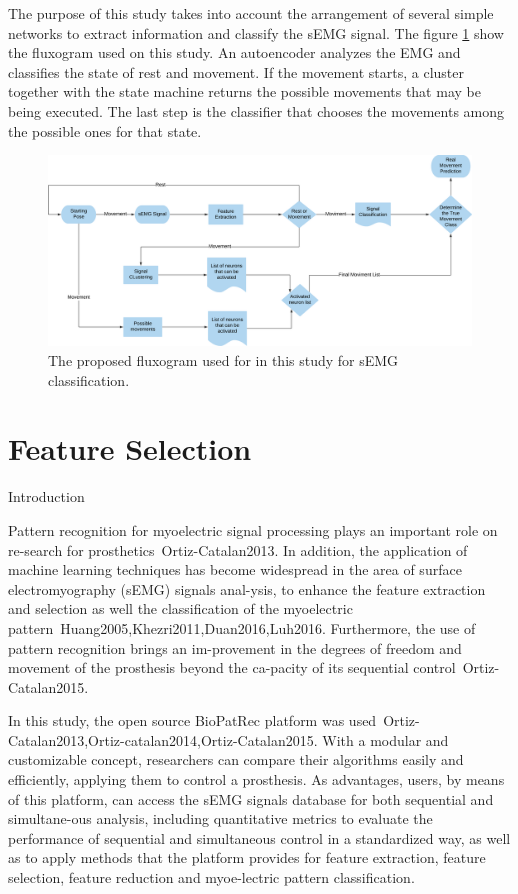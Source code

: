 \documentclass[a4paper, 12pt]{ppgeb}
\makeatletter
\renewcommand{\section}{\@startsection
{section}
{1}
{0mm}
{-\baselineskip}
{0.5\baselineskip}
{\large\bfseries\scshape}}
\makeatother
\begin{document}
The purpose of this study takes into account the arrangement of several simple networks to extract information and classify the sEMG signal. The figure \ref{fig_final_flux} show the fluxogram used on this study. An autoencoder analyzes the EMG and classifies the state of rest and movement. If the movement starts, a cluster together with the state machine returns the possible movements that may be being executed. The last step is the classifier that chooses the movements among the possible ones for that state.

\begin{figure}[h]
	\centering
	\includegraphics[width=.8\linewidth]{final_semg_classification.png}
	\caption{The proposed fluxogram used for in this study for sEMG classification.} \label{fig_final_flux}
\end{figure}

\chapter{Feature Selection}\label{ch:FS}

\section{Introduction}

Pattern recognition for myoelectric signal processing plays an important role on re-search for prosthetics~\cite{mainreferences}{Ortiz-Catalan2013}. In addition, the application of machine learning techniques has become widespread in the area of surface electromyography (sEMG) signals anal-ysis, to enhance the feature extraction and selection as well the classification of the myoelectric pattern~\cite{mainreferences}{Huang2005,Khezri2011,Duan2016,Luh2016}. Furthermore, the use of pattern recognition brings an im-provement in the degrees of freedom and movement of the prosthesis beyond the ca-pacity of its sequential control~\cite{mainreferences}{Ortiz-Catalan2015}.

In this study, the open source BioPatRec platform was used~\cite{mainreferences}{Ortiz-Catalan2013,Ortiz-catalan2014,Ortiz-Catalan2015}. With a modular and customizable concept, researchers can compare their algorithms easily and efficiently, applying them to control a prosthesis. As advantages, users, by means of this platform, can access the \ac{sEMG} signals database for both sequential and simultane-ous analysis, including quantitative metrics to evaluate the performance of sequential and simultaneous control in a standardized way, as well as to apply methods that the platform provides for feature extraction, feature selection, feature reduction and myoe-lectric pattern classification.
\end{document}
